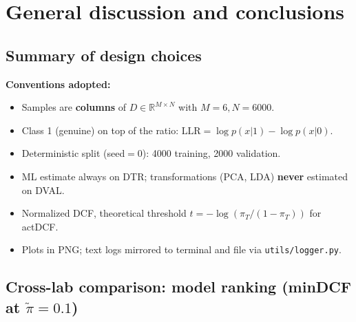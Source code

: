 \documentclass[11pt,a4paper]{article}
\begin{document}
\section{General discussion and conclusions}\label{sec:conclusions}

\subsection{Summary of design choices}

\textbf{Conventions adopted:}
\begin{itemize}
\item Samples are \textbf{columns} of $D \in \mathbb{R}^{M \times N}$
      with $M=6, N=6000$.
\item Class 1 (genuine) on top of the ratio:
      $\textrm{LLR} = \log p(x|1) - \log p(x|0)$.
\item Deterministic split (seed$=0$): 4000 training, 2000 validation.
\item ML estimate always on DTR; transformations (PCA, LDA)
      \textbf{never} estimated on DVAL.
\item Normalized DCF, theoretical threshold
      $t = -\log(\pi_T/(1-\pi_T))$ for actDCF.
\item Plots in PNG; text logs mirrored to terminal and file via
      \texttt{utils/logger.py}.
\end{itemize}

\subsection{Cross-lab comparison: model ranking (minDCF at $\tilde{\pi}=0.1$)}
\end{document}
